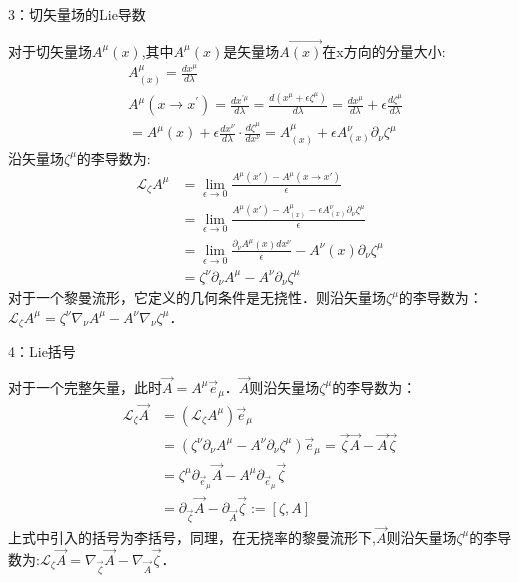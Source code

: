 3：切矢量场的Lie导数

对于切矢量场$A^{\mu}(x)$,其中$A^{\mu}(x)$是矢量场$\overrightarrow{A(x)}$在x方向的分量大小:
$$\begin{aligned}
&A^{\mu}_{(x)}=\frac{d x^{\mu}}{d \lambda}\\
&A^{\mu}\left(x \rightarrow x^{\prime}\right)=\frac{d x^{\prime \mu}}{d \lambda}=\frac{d\left(x^{\mu}+\epsilon \zeta^{\mu}\right)}{d \lambda}=\frac{d x^{\mu}}{d \lambda}+\epsilon\frac{d \zeta^{\mu}}{d \lambda} \\
&=A^{\mu}(x)+\epsilon \frac{d x^{\nu}}{d \lambda} \cdot \frac{d \zeta^{\mu}}{dx^{\nu}} =A^{\mu}_{(x)}+\epsilon A_{(x)}^{\nu}\partial_{\nu}\zeta^{\mu}
\end{aligned}$$
沿矢量场$\zeta^{\mu}$的李导数为:
$$\begin{aligned}
\mathcal{L}_{\zeta} A^{\mu} &=\lim _{\epsilon \rightarrow 0} \frac{A^{\mu}(x')-A^{\mu}(x \rightarrow x')}{\epsilon} \\
&=\lim _{\epsilon \rightarrow 0} \frac{A^{\mu}(x')-A^{\mu}_{(x)}-\epsilon A_{(x)}^{\nu}\partial_{\nu}\zeta^{\mu}}{\epsilon} \\
&=\lim _{\epsilon \rightarrow 0} \frac{\partial_{\nu} A^{\mu}(x) d x^{\nu}}{\epsilon}-A^{\nu}(x) \partial_{\nu} \zeta^{\mu} \\
&=\zeta^{\nu} \partial_{\nu} A^{\mu}-A^{\nu} \partial_{\nu} \zeta^{\mu}
\end{aligned}$$
对于一个黎曼流形，它定义的几何条件是无挠性．则沿矢量场$\zeta^{\mu}$的李导数为：$\mathcal{L}_{\zeta} A^{\mu}=\zeta^{\nu} \nabla_{\nu} A^{\mu}-A^{\nu} \nabla_{\nu} \zeta^{\mu}$．

 4：Lie括号

对于一个完整矢量，此时$\overrightarrow{A}=A^{\mu}\overrightarrow{e}_{\mu}$．$\overrightarrow{A}$则沿矢量场$\zeta^{\mu}$的李导数为：
$$\begin{aligned}
\mathcal{L}_{\zeta} \overrightarrow{A} &=\left(\mathcal{L}_{\zeta} A^{\mu}\right)\overrightarrow{e}_{\mu}  \\
&=\left(\zeta^{\nu} \partial_{\nu} A^{\mu}-A^{\nu} \partial_{\nu} \zeta^{\mu}\right) \overrightarrow{e}_{\mu} =\overrightarrow{\zeta} \overrightarrow{A}-\overrightarrow{A} \overrightarrow{\zeta} \\
&=\zeta^{\mu} \partial_{\overrightarrow{e}_{\mu}} \overrightarrow{A}-A^{\mu} \partial_{\overrightarrow{e}_{\mu}} \overrightarrow{\zeta}\\
&=\partial_{\overrightarrow{\zeta}} \overrightarrow{A}-\partial_{\overrightarrow{A}} \overrightarrow{\zeta}:=[\zeta, A]
\end{aligned}$$
上式中引入的括号为李括号，同理，在无挠率的黎曼流形下,$\overrightarrow{A}$则沿矢量场$\zeta^{\mu}$的李导数为:$\mathcal{L}_{\zeta} \overrightarrow{A}=\nabla_{\overrightarrow{\zeta}} \overrightarrow{A}-\nabla_{\overrightarrow{A}} \overrightarrow{\zeta}$．

